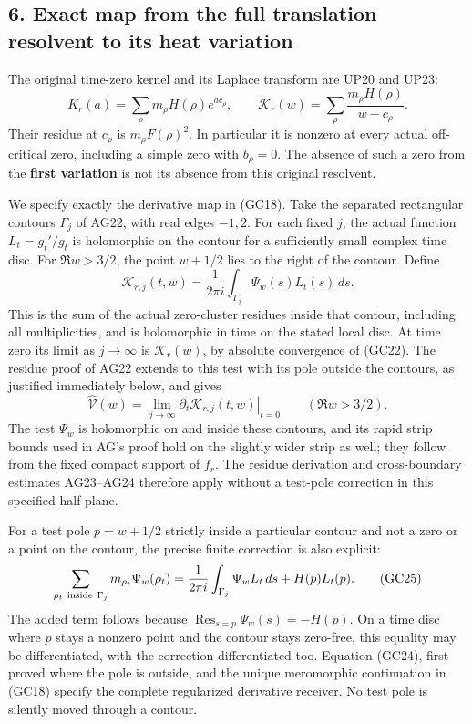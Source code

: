 \documentclass[
  10pt,
  a4paper,
]{article}
\begin{document}
\subsection{6. Exact map from the full translation resolvent to its heat
variation}\label{exact-map-from-the-full-translation-resolvent-to-its-heat-variation}

The original time-zero kernel and its Laplace transform are UP20 and
UP23: \[
K_r(a)=\sum_\rho m_\rho H(\rho)e^{ac_\rho},\qquad
\mathscr K_r(w)=\sum_\rho\frac{m_\rho H(\rho)}{w-c_\rho}.
\tag{GC22}
\] Their residue at \(c_\rho\) is \(m_\rho F(\rho)^2\). In particular it
is nonzero at every actual off-critical zero, including a simple zero
with \(b_\rho=0\). The absence of such a zero from the \textbf{first
variation} is not its absence from this original resolvent.

We specify exactly the derivative map in (GC18). Take the separated
rectangular contours \(\Gamma_j\) of AG22, with real edges \(-1,2\). For
each fixed \(j\), the actual function \(L_t=g_t'/g_t\) is holomorphic on
the contour for a sufficiently small complex time disc. For
\(\Re w>3/2\), the point \(w+1/2\) lies to the right of the contour.
Define \[
\mathscr K_{r,j}(t,w)
=\frac1{2\pi i}\int_{\Gamma_j}\Psi_w(s)L_t(s)\,ds.
\tag{GC23}
\] This is the sum of the actual zero-cluster residues inside that
contour, including all multiplicities, and is holomorphic in time on the
stated local disc. At time zero its limit as \(j\to\infty\) is
\(\mathscr K_r(w)\), by absolute convergence of (GC22). The residue
proof of AG22 extends to this test with its pole outside the contours,
as justified immediately below, and gives \[
\widehat{\mathcal V}(w)
=\lim_{j\to\infty}
\left.\partial_t\mathscr K_{r,j}(t,w)\right|_{t=0}
\qquad(\Re w>3/2).
\tag{GC24}
\] The test \(\Psi_w\) is holomorphic on and inside these contours, and
its rapid strip bounds used in AG's proof hold on the slightly wider
strip as well; they follow from the fixed compact support of \(f_r\).
The residue derivation and cross-boundary estimates AG23--AG24 therefore
apply without a test-pole correction in this specified half-plane.

For a test pole \(p=w+1/2\) strictly inside a particular contour and not
a zero or a point on the contour, the precise finite correction is also
explicit: \[
\sum_{\rho_t\ {\rm inside}\ \Gamma_j}
m_{\rho_t}\Psi_w(\rho_t)
=\frac1{2\pi i}\int_{\Gamma_j}\Psi_w L_t\,ds
+H(p)L_t(p).
\tag{GC25}
\] The added term follows because
\(\operatorname{Res}_{s=p}\Psi_w(s)=-H(p)\). On a time disc where \(p\)
stays a nonzero point and the contour stays zero-free, this equality may
be differentiated, with the correction differentiated too. Equation
(GC24), first proved where the pole is outside, and the unique
meromorphic continuation in (GC18) specify the complete regularized
derivative receiver. No test pole is silently moved through a contour.
\end{document}
